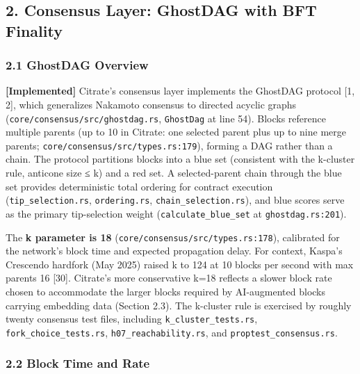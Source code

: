 \subsection{2. Consensus Layer: GhostDAG with BFT
Finality}\label{consensus-layer-ghostdag-with-bft-finality}

\subsubsection{2.1 GhostDAG Overview}\label{ghostdag-overview}

\textbf{{[}Implemented{]}} Citrate's consensus layer implements the
GhostDAG protocol {[}1, 2{]}, which generalizes Nakamoto consensus to
directed acyclic graphs (\texttt{core/consensus/src/ghostdag.rs},
\texttt{GhostDag} at line 54). Blocks reference multiple parents (up to
10 in Citrate: one selected parent plus up to nine merge parents;
\texttt{core/consensus/src/types.rs:179}), forming a DAG rather than a
chain. The protocol partitions blocks into a blue set (consistent with
the k-cluster rule, anticone size ≤ k) and a red set. A selected-parent
chain through the blue set provides deterministic total ordering for
contract execution (\texttt{tip\_selection.rs}, \texttt{ordering.rs},
\texttt{chain\_selection.rs}), and blue scores serve as the primary
tip-selection weight (\texttt{calculate\_blue\_set} at
\texttt{ghostdag.rs:201}).

The \textbf{k parameter is 18}
(\texttt{core/consensus/src/types.rs:178}), calibrated for the network's
block time and expected propagation delay. For context, Kaspa's
Crescendo hardfork (May 2025) raised k to 124 at 10 blocks per second
with max parents 16 {[}30{]}. Citrate's more conservative k=18 reflects
a slower block rate chosen to accommodate the larger blocks required by
AI-augmented blocks carrying embedding data (Section 2.3). The k-cluster
rule is exercised by roughly twenty consensus test files, including
\texttt{k\_cluster\_tests.rs}, \texttt{fork\_choice\_tests.rs},
\texttt{h07\_reachability.rs}, and \texttt{proptest\_consensus.rs}.

\subsubsection{2.2 Block Time and Rate}\label{block-time-and-rate}

